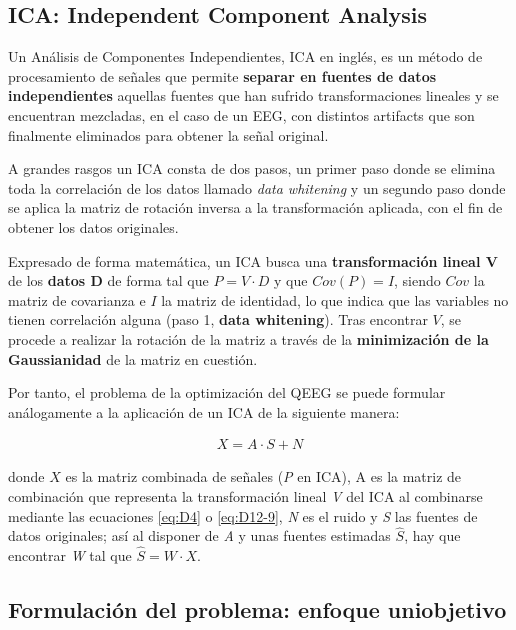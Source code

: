\subsection{ICA: Independent Component Analysis}

Un Análisis de Componentes Independientes, ICA en inglés, es un método de procesamiento de señales que permite \textbf{separar en fuentes de datos independientes} aquellas fuentes que han sufrido transformaciones lineales y se encuentran mezcladas, en el caso de un EEG, con distintos artifacts que son finalmente eliminados para obtener la señal original\cite{ICA4Dummies}.

A grandes rasgos un ICA consta de dos pasos, un primer paso donde se elimina toda la correlación de los datos llamado \textit{data whitening} y un segundo paso donde se aplica la matriz de rotación inversa a la transformación aplicada, con el fin de obtener los datos originales.

 Expresado de forma matemática, un ICA busca una \textbf{transformación lineal V} de los \textbf{datos D} de forma tal que $P = V\cdot D$ y que $Cov(P) = I$, siendo $Cov$ la matriz de covarianza e $I$ la matriz de identidad, lo que indica que las variables no tienen correlación alguna (paso 1, \textbf{data whitening}). Tras encontrar $V$, se procede a realizar la rotación de la matriz a través de la \textbf{minimización de la Gaussianidad} de la matriz en cuestión.
 
 Por tanto, el problema de la optimización del QEEG se puede formular análogamente a la aplicación de un ICA de la siguiente manera:
 
 \begin{equation} \label{eq: problem1}
	 \begin{gathered}
		X = A\cdot S + N
	 \end{gathered}
 \end{equation}
 
 donde $X$ es la matriz combinada de señales (\textit{P} en ICA), A es la matriz de combinación que representa la transformación lineal \textit{V} del ICA al combinarse mediante las ecuaciones \ref{eq:D4} o \ref{eq:D12-9}, \textit{N} es el ruido y \textit{S} las fuentes de datos originales; así al disponer de \textit{A} y unas fuentes estimadas $\hat{S}$, hay que encontrar \textit{W} tal que $\hat{S} = W\cdot X$.
 
 \subsection{Formulación del problema: enfoque uniobjetivo}
 
